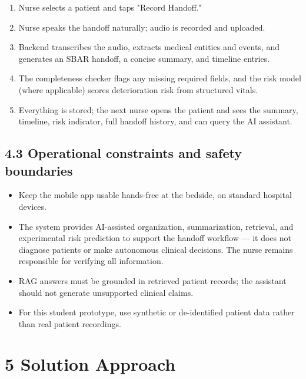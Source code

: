 \documentclass[
]{article}
\begin{document}
\begin{enumerate}
\def\labelenumi{\arabic{enumi}.}
\item
  Nurse selects a patient and taps "Record Handoff."
\item
  Nurse speaks the handoff naturally; audio is recorded and uploaded.
\item
  Backend transcribes the audio, extracts medical entities and events,
  and generates an SBAR handoff, a concise summary, and timeline
  entries.
\item
  The completeness checker flags any missing required fields, and the
  risk model (where applicable) scores deterioration risk from
  structured vitals.
\item
  Everything is stored; the next nurse opens the patient and sees the
  summary, timeline, risk indicator, full handoff history, and can query
  the AI assistant.
\end{enumerate}

\subsection{4.3 Operational constraints and safety
boundaries}\label{operational-constraints-and-safety-boundaries}

\begin{itemize}
\item
  Keep the mobile app usable hands-free at the bedside, on standard
  hospital devices.
\item
  The system provides AI-assisted organization, summarization,
  retrieval, and experimental risk prediction to support the handoff
  workflow --- it does not diagnose patients or make autonomous clinical
  decisions. The nurse remains responsible for verifying all
  information.
\item
  RAG answers must be grounded in retrieved patient records; the
  assistant should not generate unsupported clinical claims.
\item
  For this student prototype, use synthetic or de-identified patient
  data rather than real patient recordings.
\end{itemize}

\section{}\label{section-1}

\section{5 Solution Approach}\label{solution-approach}
\end{document}
